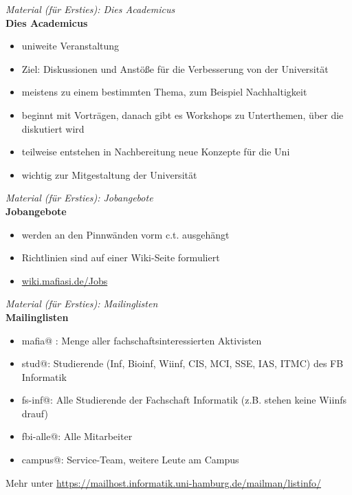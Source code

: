\documentclass[a4paper,11pt]{scrartcl} %
\begin{document}
\begin{framed}
\textit{Material (für Ersties): Dies Academicus } \\

\textbf{Dies Academicus} \\
\begin{itemize}
\item uniweite Veranstaltung
\item Ziel: Diskussionen und Anstöße für die Verbesserung von der Universität
\item meistens zu einem bestimmten Thema, zum Beispiel Nachhaltigkeit
\item beginnt mit Vorträgen, danach gibt es Workshops zu Unterthemen, über die diskutiert wird
\item teilweise entstehen in Nachbereitung neue Konzepte für die Uni
\item wichtig zur Mitgestaltung der Universität
\end{itemize}
\end{framed}

\begin{framed}
\textit{Material (für Ersties): Jobangebote}\\

\textbf{Jobangebote}
\begin{itemize}
\item werden an den Pinnwänden vorm c.t. ausgehängt
\item Richtlinien sind auf einer Wiki-Seite formuliert
\item \url{wiki.mafiasi.de/Jobs}
\end{itemize}
\end{framed}
\begin{framed}
\textit{Material (für Ersties): Mailinglisten} \\

\textbf{Mailinglisten}\\
\begin{itemize}
\item mafia@ : Menge aller fachschaftsinteressierten Aktivisten
\item stud@: Studierende (Inf, Bioinf, Wiinf, CIS, MCI, SSE, IAS, ITMC) des FB Informatik
\item fs-inf@: Alle Studierende der Fachschaft Informatik (z.B. stehen keine Wiinfs drauf)
\item fbi-alle@: Alle Mitarbeiter
\item campus@: Service-Team, weitere Leute am Campus
\end{itemize}

Mehr unter \url{https://mailhost.informatik.uni-hamburg.de/mailman/listinfo/}
\end{framed}
\end{document}
